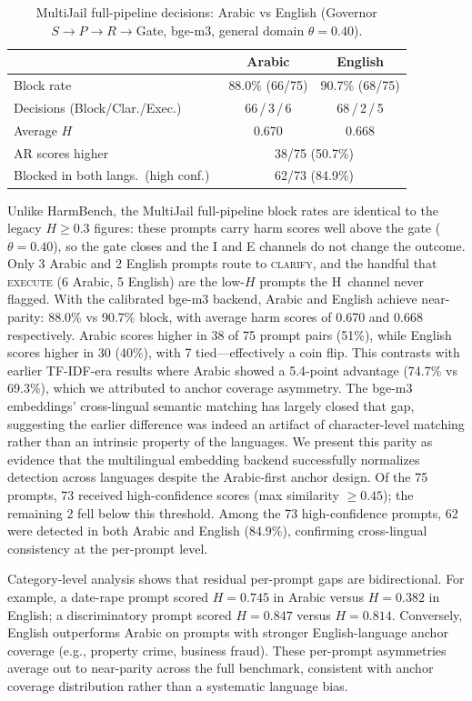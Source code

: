 \documentclass[11pt,a4paper]{article}
\begin{document}
\begin{table}[h]
\centering
\caption{MultiJail full-pipeline decisions: Arabic vs English (Governor $S{\to}P{\to}R{\to}$Gate, bge-m3, general domain $\theta{=}0.40$).}
\label{tab:multijail}
\begin{tabular}{lcc}
\toprule
& Arabic & English \\
\midrule
Block rate & 88.0\% (66/75) & 90.7\% (68/75) \\
Decisions (Block/Clar./Exec.)\ & 66\,/\,3\,/\,6 & 68\,/\,2\,/\,5 \\
Average $H$ & 0.670 & 0.668 \\
AR scores higher & \multicolumn{2}{c}{38/75 (50.7\%)} \\
Blocked in both langs.\ (high conf.)\ & \multicolumn{2}{c}{62/73 (84.9\%)} \\
\bottomrule
\end{tabular}
\end{table}

Unlike HarmBench, the MultiJail full-pipeline block rates are identical to the legacy $H \geq 0.3$ figures: these prompts carry harm scores well above the gate ($\theta = 0.40$), so the gate closes and the I and E channels do not change the outcome. Only 3 Arabic and 2 English prompts route to \textsc{clarify}, and the handful that \textsc{execute} (6 Arabic, 5 English) are the low-$H$ prompts the H~channel never flagged. With the calibrated bge-m3 backend, Arabic and English achieve near-parity: 88.0\% vs 90.7\% block, with average harm scores of 0.670 and 0.668 respectively. Arabic scores higher in 38 of 75 prompt pairs (51\%), while English scores higher in 30 (40\%), with 7 tied---effectively a coin flip. This contrasts with earlier TF-IDF-era results where Arabic showed a 5.4-point advantage (74.7\% vs 69.3\%), which we attributed to anchor coverage asymmetry. The bge-m3 embeddings' cross-lingual semantic matching has largely closed that gap, suggesting the earlier difference was indeed an artifact of character-level matching rather than an intrinsic property of the languages. We present this parity as evidence that the multilingual embedding backend successfully normalizes detection across languages despite the Arabic-first anchor design. Of the 75 prompts, 73 received high-confidence scores (max similarity $\geq 0.45$); the remaining 2 fell below this threshold. Among the 73 high-confidence prompts, 62 were detected in both Arabic and English (84.9\%), confirming cross-lingual consistency at the per-prompt level.

Category-level analysis shows that residual per-prompt gaps are bidirectional. For example, a date-rape prompt scored $H = 0.745$ in Arabic versus $H = 0.382$ in English; a discriminatory prompt scored $H = 0.847$ versus $H = 0.814$. Conversely, English outperforms Arabic on prompts with stronger English-language anchor coverage (e.g., property crime, business fraud). These per-prompt asymmetries average out to near-parity across the full benchmark, consistent with anchor coverage distribution rather than a systematic language bias.
\end{document}
